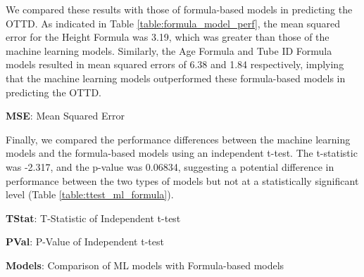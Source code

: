 \documentclass[11pt]{article}
\begin{document}
We compared these results with those of formula-based models in predicting the OTTD. As indicated in Table {}\ref{table:formula_model_perf}, the mean squared error for the Height Formula was 3.19, which was greater than those of the machine learning models. Similarly, the Age Formula and Tube ID Formula models resulted in mean squared errors of 6.38 and 1.84 respectively, implying that the machine learning models outperformed these formula-based models in predicting the OTTD.

\begin{table}[h]
\caption{Overall Performance of Formula-Based Models}
\label{table:formula_model_perf}
\begin{threeparttable}
\renewcommand{\TPTminimum}{\linewidth}
\begin{tablenotes}
\footnotesize
\item \textbf{MSE}: Mean Squared Error
\end{tablenotes}
\end{threeparttable}
\end{table}


Finally, we compared the performance differences between the machine learning models and the formula-based models using an independent t-test. The t-statistic was -2.317, and the p-value was 0.06834, suggesting a potential difference in performance between the two types of models but not at a statistically significant level (Table {}\ref{table:ttest_ml_formula}).

\begin{table}[h]
\caption{Independent t-test: Comparison of ML models vs Formula-Based models}
\label{table:ttest_ml_formula}
\begin{threeparttable}
\renewcommand{\TPTminimum}{\linewidth}
\begin{tablenotes}
\footnotesize
\item \textbf{TStat}: T-Statistic of Independent t-test
\item \textbf{PVal}: P-Value of Independent t-test
\item \textbf{Models}: Comparison of ML models with Formula-based models
\end{tablenotes}
\end{threeparttable}
\end{table}
\end{document}

